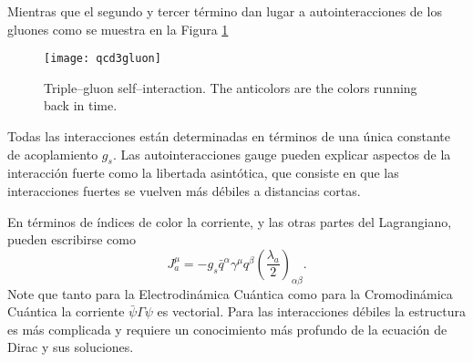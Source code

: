 Mientras que el segundo y tercer término dan lugar a autointeracciones de los gluones como se muestra en la Figura \ref{fig:qcd3gluon}
\begin{figure}
  \centering
  \texttt{[image: qcd3gluon]}%
  \caption{Triple--gluon self--interaction. The anticolors are the colors running back in time.}
  \label{fig:qcd3gluon}
\end{figure}


Todas las interacciones están determinadas en términos de una única constante de acoplamiento $g_s$. Las autointeracciones gauge pueden explicar aspectos de la interacción fuerte como la libertada asintótica, que consiste en que las interacciones fuertes se vuelven más débiles a distancias cortas. 

En términos de índices de color la corriente, y las otras partes del Lagrangiano, pueden escribirse como
\begin{equation}
  \label{eq:223qft}
  J^\mu_a=-g_s\bar{q}^\alpha\gamma^\mu q^\beta\left(\frac{\lambda_a}{2}\right)_{\alpha\beta}.
\end{equation}
Note que tanto para la Electrodinámica Cuántica como para la Cromodinámica Cuántica la corriente $\bar{\psi}\Gamma\psi$ es vectorial. Para las interacciones débiles la estructura es más complicada y requiere un conocimiento más profundo de la ecuación de Dirac y sus soluciones.

